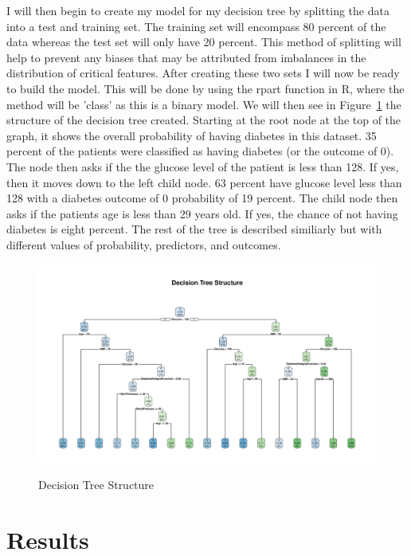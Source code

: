 \documentclass[12pt]{article}
\begin{document}
    I will then begin to create my model for my decision tree by splitting the data into a test and training set. The training set will
    encompass 80 percent of the data whereas the test set will only have 20 percent. This method of splitting will help to prevent any biases that may 
    be attributed from imbalances in the distribution of critical features. After creating these two sets I will now be ready
    to build the model. This will be done by using the rpart function in R, where the method will be 'class' as this is a binary model. We will
    then see in Figure~\ref{fig:structure} the structure of the decision tree created. Starting at the root node at the top of the graph, it shows the overall probability
    of having diabetes in this dataset. 35 percent of the patients were classified as having diabetes (or the outcome of 0). The node then asks if the the
    glucose level of the patient is less than 128. If yes, then it moves down to the left child node. 63 percent have glucose level less than 128 with a diabetes
    outcome of 0 probability of 19 percent. The child node then asks if the patients age is less than 29 years old. If yes, the chance of not having diabetes is eight percent.
    The rest of the tree is described similiarly but with different values of probability, predictors, and outcomes. 

\begin{figure}[tbp]
  \centering
  \caption{Decision Tree Structure}
  \includegraphics[width=\textwidth]{Decision Tree Structure.pdf}
  \label{fig:structure}
  \end{figure}

\section{Results}
\label{sec:resu}
\end{document}
